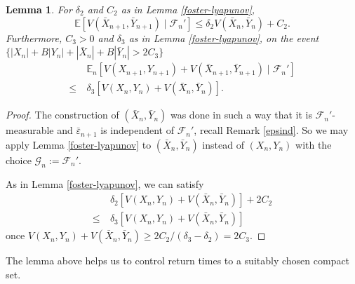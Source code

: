 \documentclass{article}
\newtheorem{lemma}[theorem]{Lemma}
\def\mE{\mathbb{E}}
\begin{document}
\begin{lemma}\label{3step} For $\delta_2$ and $C_2$ as in Lemma \ref{foster-lyapunov},
\begin{equation}\label{nemobar}
    \mathbb{E}[V(\bar{X}_{n+1},\bar{Y}_{n+1})\mid\mathcal{F}_n']\leq \delta_2 V(\bar{X}_{n},\bar{Y}_{n})+C_2.
    \end{equation}
    Furthermore, $C_{3}>0$ and $\delta_3$ as in Lemma \ref{foster-lyapunov}, on the event
$\{|X_n|+B|Y_n|+|\bar{X}_{n}|+B|\bar{Y}_{n}|>2C_3\}$
\begin{equation}
    \label{eq:lyap_contraction1}
    \begin{aligned}
      &\mE_n[V(X_{n+1},Y_{n+1})+V(\bar{X}_{n+1},\bar{Y}_{n+1})\mid\mathcal{F}_{n}']\\
      \leq~&\delta_3 [V(X_{n},Y_{n}) +V(\bar{X}_{n},\bar{Y}_{n})].
    \end{aligned}    
\end{equation}    
\end{lemma}
\begin{proof} The construction of $(\bar{X}_{n},\bar{Y}_{n})$ was done in such a way that it is $\mathcal{F}_{n}'$-measurable
and $\bar{\varepsilon}_{n+1}$ is independent of $\mathcal{F}_{n}'$, recall Remark \ref{epsind}. So we may apply Lemma 
\ref{foster-lyapunov} to
$(\bar{X}_{n},\bar{Y}_{n})$ instead of $(X_{n},Y_{n})$ with the choice $\mathcal{G}_{n}:=\mathcal{F}_{n}'$.

As in Lemma \ref{foster-lyapunov}, we can satisfy 
\begin{align*}
  &\delta_2 [V(X_{n},Y_{n})+V(\bar{X}_{n},\bar{Y}_{n})]+2C_2\\
  \leq ~&\delta_3 
[V(X_{n},Y_{n})+V(\bar{X}_{n},\bar{Y}_{n})]  
\end{align*}
once $V(X_{n},Y_{n})+V(\bar{X}_{n},\bar{Y}_{n})\geq 2C_2/(\delta_3-\delta_2)=2C_{3}$.
\end{proof}













The lemma above helps us to control return times to a suitably chosen compact set. 
\end{document}
